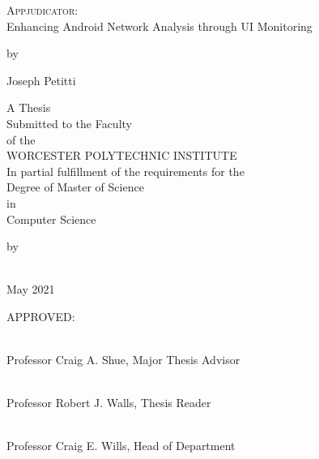 \begin{titlepage}
\begin{center}
\doublespacing


{\Large \textsc{Appjudicator}: \\
Enhancing Android Network Analysis through UI Monitoring}

\vfill

by \par

Joseph Petitti

\vfill

A Thesis \\
Submitted to the Faculty \\
of the \\
WORCESTER POLYTECHNIC INSTITUTE \\
In partial fulfillment of the requirements for the \\
Degree of Master of Science \\
in \\
Computer Science \par

\vfill

by

\vspace{0.55cm}

\underline{\hspace{3in}} \\

May 2021

\end{center}

\vfill

\begin{flushleft}
APPROVED: \par
\vspace{\baselineskip}

\underline{\hspace{3in}} \\
Professor Craig A. Shue, Major Thesis Advisor \par
\vspace{\baselineskip}

\underline{\hspace{3in}} \\
Professor Robert J. Walls, Thesis Reader \par
\vspace{\baselineskip}

\underline{\hspace{3in}} \\
Professor Craig E. Wills, Head of Department \par
\end{flushleft}
\end{titlepage}
